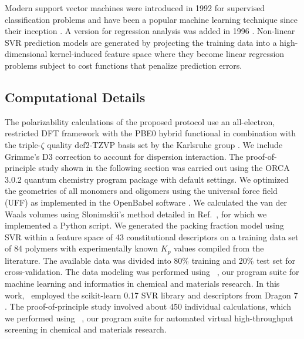 Modern support vector machines were introduced in 1992 for supervised classification problems and have been a popular machine learning technique since their inception \cite{Boser1992}. A version for regression analysis was added in 1996 \cite{drucker1997,smola2004}. Non-linear SVR prediction models are generated by projecting the training data into a high-dimensional kernel-induced feature space where they become linear regression problems subject to cost functions that penalize prediction errors.


\subsection{Computational Details}
\label{subsec:compdetails}
The polarizability calculations of the proposed protocol use an all-electron, restricted DFT framework with the PBE0 hybrid functional \cite{Adamo1999} in combination with the triple-$\zeta$ quality def2-TZVP basis set by the Karlsruhe group \cite{Weigend2005}. We include Grimme's D3 correction \cite{Grimme2010} to account for dispersion interaction. The proof-of-principle study shown in the following section was carried out using the ORCA 3.0.2 quantum chemistry program package \cite{Neese2012} with default settings. We optimized the geometries of all monomers and oligomers using the universal force field (UFF) \cite{Rappe1992} as implemented in the OpenBabel software \cite{OBoyle2011}. We calculated the van der Waals volumes using Slonimskii's method detailed in Ref.\ \cite{Slonimskii1970}, for which we implemented a Python script.
We generated the packing fraction model using SVR within a feature space of 43 constitutional descriptors on a training data set of 84 polymers with experimentally known $K_p$ values compiled from the literature. The available data was divided into 80\% training and 20\% test set for cross-validation. 
The data modeling was performed using \chemml\ \cite{Haghighatlari2017}, our program suite for machine learning and informatics in chemical and materials research. In this work, \chemml\ employed the scikit-learn 0.17 SVR library \cite{scikit-learn} and descriptors from Dragon 7 \cite{Taletesrl2011}.
The proof-of-principle study involved about 450 individual calculations, which we performed using \chemhtps\ \cite{Afzal2018c}, our program suite for automated virtual high-throughput screening in chemical and materials research.  



